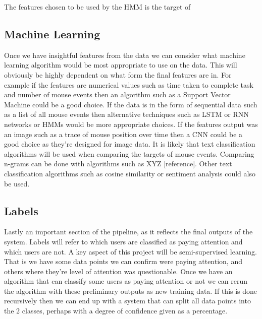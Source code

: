 \documentclass{article}
\begin{document}
The features chosen to be used by the HMM is the target of 

\subsection{Machine Learning}


Once we have insightful features from the data we can consider what machine learning algorithm would be most appropriate to use on the data.
This will obviously be highly dependent on what form the final features are in.
For example if the features are numerical values such as time taken to complete task and number of mouse events then an algorithm such as a Support Vector Machine could be a good choice.
If the data is in the form of sequential data such as a list of all mouse events then alternative techniques such as LSTM or RNN networks or HMMs would be more appropriate choices.
If the features output was an image such as a trace of mouse position over time then a CNN could be a good choice as they're designed for image data.
It is likely that text classification algorithms will be used when comparing the targets of mouse events.
Comparing n-grams can be done with algorithms such as XYZ [reference].
Other text classification algorithms such as cosine similarity or sentiment analysis could also be used.

\subsection{Labels}


Lastly an important section of the pipeline, as it reflects the final outputs of the system.
Labels will refer to which users are classified as paying attention and which users are not.
A key aspect of this project will be semi-supervised learning.
That is we have some data points we can confirm were paying attention, and others where they're level of attention was questionable.
Once we have an algorithm that can classify some users as paying attention or not we can rerun the algorithm with these preliminary outputs as new training data.
If this is done recursively then we can end up with a system that can split all data points into the 2 classes, perhaps with a degree of confidence given as a percentage.


\end{document}
